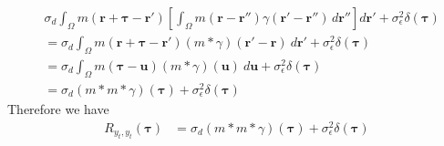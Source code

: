 \documentclass[]{article}
\begin{document}
\begin{align}
&\sigma_d\int_{\Omega} m\left(\mathbf r  + \boldsymbol\tau - \mathbf r'\right) \left[\int_{\Omega} m\left(\mathbf r - \mathbf r''\right)\gamma(\mathbf r'-\mathbf r'') \, d\mathbf r'' \right]  d\mathbf r'+\sigma_{\epsilon}^2\delta(\boldsymbol\tau) \nonumber \\
&=\sigma_d\int_{\Omega} m\left(\mathbf r  + \boldsymbol\tau - \mathbf r'\right) \left(m\ast\gamma\right)(\mathbf r'-\mathbf r) \ d\mathbf r'+\sigma_{\epsilon}^2\delta(\boldsymbol\tau)\\
&=\sigma_d\int_{\Omega} m\left(\boldsymbol\tau - \mathbf u\right) \left(m\ast\gamma\right)(\mathbf u) \ d\mathbf u+\sigma_{\epsilon}^2\delta(\boldsymbol\tau) \nonumber \\
&=\sigma_d\left(m \ast m \ast \gamma\right)\left(\boldsymbol{\tau}\right)+\sigma_{\epsilon}^2\delta(\boldsymbol\tau)
\end{align}
Therefore we have
\begin{align}
	R_{y_{t},y_{t}}(\boldsymbol{\tau}) &= \sigma_d\left(m \ast m \ast \gamma\right)\left(\boldsymbol{\tau}\right)+\sigma_{\epsilon}^2\delta(\boldsymbol\tau)
\end{align}
\end{document}
